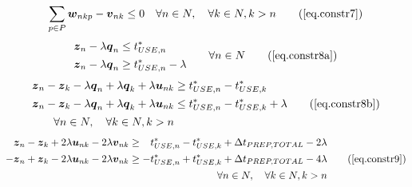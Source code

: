\begin{equation}
    \sum_{p \in P} \boldsymbol{w}_{nkp} - \boldsymbol{v}_{nk} \le 0 \quad
    \forall n \in N, \quad \forall k \in N, k > n
    \tag{\ref{eq.constr7}}
\end{equation}
\begin{equation}
    \begin{split}
        \begin{alignedat}{2}
            \boldsymbol{z}_{n} & {}-{} & \lambda \boldsymbol{q}_{n} & \le
            t_{USE,n}^{*}\\
            \boldsymbol{z}_{n} & {}-{} & \lambda \boldsymbol{q}_{n} & \ge
            t_{USE,n}^{*} - \lambda
        \end{alignedat}
    \end{split}
    \quad\quad
    \begin{split}
        \forall n \in N
    \end{split}
    \tag{\ref{eq.constr8a}}
\end{equation}
\begin{equation}
    \begin{split}
        \boldsymbol{z}_{n} - \boldsymbol{z}_{k} - \lambda \boldsymbol{q}_{n}
        + \lambda \boldsymbol{q}_{k} + \lambda \boldsymbol{u}_{nk} &\ge
        t_{USE,n}^{*} - t_{USE,k}^{*}\\
        \boldsymbol{z}_{n} - \boldsymbol{z}_{k} - \lambda \boldsymbol{q}_{n}
        + \lambda \boldsymbol{q}_{k} + \lambda \boldsymbol{u}_{nk} &\le
        t_{USE,n}^{*} - t_{USE,k}^{*} + \lambda\\
        \forall n \in N, \quad \forall k \in N, k > n
    \end{split}
    \tag{\ref{eq.constr8b}}
\end{equation}
\begin{equation}
    \begin{split}
        \begin{alignedat}{10}
            &\boldsymbol{z}_{n} {}-{} &\boldsymbol{z}_{k} {}+{} &2 \lambda
            \boldsymbol{u}_{nk} {}-{} &2 \lambda \boldsymbol{v}_{nk} &\ge
            &t_{USE,n}^{*} {}-{} &t_{USE,k}^{*} {}+{}
            &\Delta &t_{PREP,TOTAL} {}-{} 2 &\lambda\\
            - &\boldsymbol{z}_{n} {}+{} &\boldsymbol{z}_{k} {}-{} &2 \lambda
            \boldsymbol{u}_{nk} {}-{} &2 \lambda \boldsymbol{v}_{nk} &\ge
            - &t_{USE,n}^{*} {}+{} &t_{USE,k}^{*} {}+{}
            &\Delta &t_{PREP,TOTAL} {}-{} 4 &\lambda
        \end{alignedat}
        \\\forall n \in N, \quad \forall k \in N, k > n
    \end{split}
    \tag{\ref{eq.constr9}}
\end{equation}
